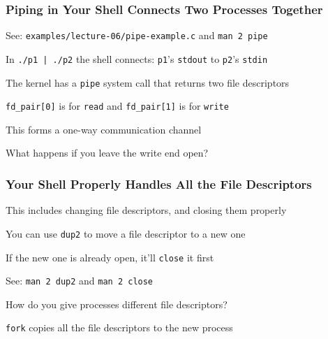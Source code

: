   \begin{frame}
    \frametitle{Piping in Your Shell Connects Two Processes Together}

    See: \texttt{examples/lecture-06/pipe-example.c} and \texttt{man 2 pipe}

    \vspace{2em}

    In \texttt{./p1 | ./p2} the shell connects:
    \texttt{p1}'s \texttt{stdout} to \texttt{p2}'s \texttt{stdin}

    \vspace{2em}

    The kernel has a \texttt{pipe} system call that returns two file descriptors

    \hspace{2em} \texttt{fd\_pair[0]} is for \texttt{read} and
    \texttt{fd\_pair[1]} is for \texttt{write}

    \vspace{2em}

    This forms a one-way communication channel

    \vspace{2em}

    What happens if you leave the write end open?
  \end{frame}

  \begin{frame}
    \frametitle{Your Shell Properly Handles All the File Descriptors}

    This includes changing file descriptors, and closing them properly

    \vspace{2em}

    You can use \texttt{dup2} to move a file descriptor to a new one

    \hspace{2em} If the new one is already open, it'll \texttt{close} it first

    \vspace{2em}
    
    See: \texttt{man 2 dup2} and \texttt{man 2 close}

    \vspace{2em}

    How do you give processes different file descriptors?

    \hspace{2em} \texttt{fork} copies all the file descriptors to the new process
  \end{frame}

